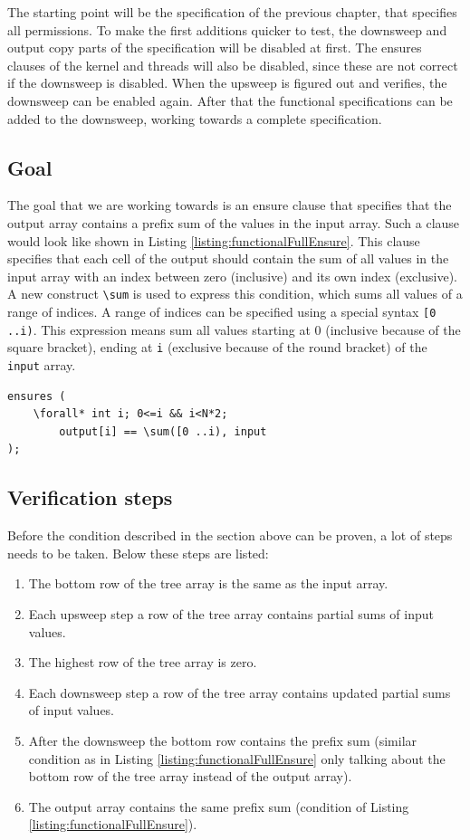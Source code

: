 \documentclass[a4paper]{article}
\newcommand{\code}[1]{\texttt{\small \color{inline}#1}} %
\begin{document}
The starting point will be the specification of the previous chapter, that specifies all permissions. To make the first additions quicker to test, the downsweep and output copy parts of the specification will be disabled at first. The ensures clauses of the kernel and threads will also be disabled, since these are not correct if the downsweep is disabled. When the upsweep is figured out and verifies, the downsweep can be enabled again. After that the functional specifications can be added to the downsweep, working towards a complete specification.

\subsection{Goal}
The goal that we are working towards is an ensure clause that specifies that the output array contains a prefix sum of the values in the input array. Such a clause would look like shown in Listing \ref{listing:functionalFullEnsure}. This clause specifies that each cell of the output should contain the sum of all values in the input array with an index between zero (inclusive) and its own index (exclusive). A new construct \code{\textbackslash sum} is used to express this condition, which sums all values of a range of indices. A range of indices can be specified using a special syntax \code{[0 ..i)}. This expression means sum all values starting at 0 (inclusive because of the square bracket), ending at \code{i} (exclusive because of the round bracket) of the \code{input} array.

\begin{lstlisting}[caption=Ensure clause of the program that should be proven eventually, label=listing:functionalFullEnsure, float=htpb]
ensures (
	\forall* int i; 0<=i && i<N*2; 
		output[i] == \sum([0 ..i), input
);
\end{lstlisting}

\subsection{Verification steps}
Before the condition described in the section above can be proven, a lot of steps needs to be taken. Below these steps are listed:
\begin{enumerate}
	\item The bottom row of the tree array is the same as the input array.
	\item Each upsweep step a row of the tree array contains partial sums of input values.
	\item The highest row of the tree array is zero.
	\item Each downsweep step a row of the tree array contains updated partial sums of input values.
	\item After the downsweep the bottom row contains the prefix sum (similar condition as in Listing \ref{listing:functionalFullEnsure} only talking about the bottom row of the tree array instead of the output array).
	\item The output array contains the same prefix sum (condition of Listing \ref{listing:functionalFullEnsure}).
\end{enumerate}
\end{document}

